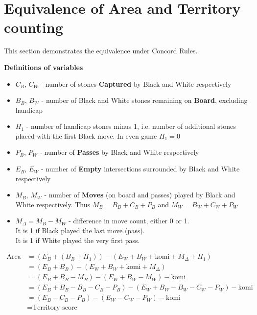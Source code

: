 \documentclass[11pt]{article}
\begin{document}
\newpage
\section*{Equivalence of Area and Territory counting}

This section demonstrates the equivalence under Concord Rules.

\textbf{Definitions of variables}

\begin{itemize}
\item $C_B$, $C_W$ - number of stones \textbf{Captured} by Black and White respectively
\item $B_B$, $B_W$ - number of Black and White stones remaining on \textbf{Board}, excluding handicap
\item $H_1$ - number of handicap stones minus 1, i.e. number of additional stones placed with the first Black move.
In even game $H_1 = 0$
\item $P_B$, $P_W$ - number of \textbf{Passes} by Black and White respectively
\item $E_B$, $E_W$ - number of \textbf{Empty} intersections surrounded by Black and White respectively
\item $M_B$, $M_W$ - number of \textbf{Moves} (on board and passes) played by Black and White respectively.
Thus $M_B = B_B + C_B + P_B$ and $M_W = B_W + C_W + P_W$
\item $M_\Delta = M_B - M_W$ - difference in move count, either 0 or 1. \\
It is 1 if Black played the last move (pass).\\
It is 1 if White played the very first pass.
\end{itemize}

\begin{align}
\text{Area score} &= (E_B + (B_B+H_1)) - (E_W + B_W + \text{komi} + M_\Delta + H_1) \\
&= (E_B + B_B) - (E_W + B_W + \text{komi} + M_\Delta) \\
&= (E_B + B_B - M_B) - (E_W + B_W - M_W) - \text{komi} \\
&= (E_B + B_B - B_B - C_B - P_B ) - (E_W + B_W - B_W - C_W - P_W) - \text{komi} \\
&= (E_B - C_B - P_B) - (E_W - C_W - P_W) - \text{komi} \\
&= \text{Territory score}
\end{align}
\end{document}
